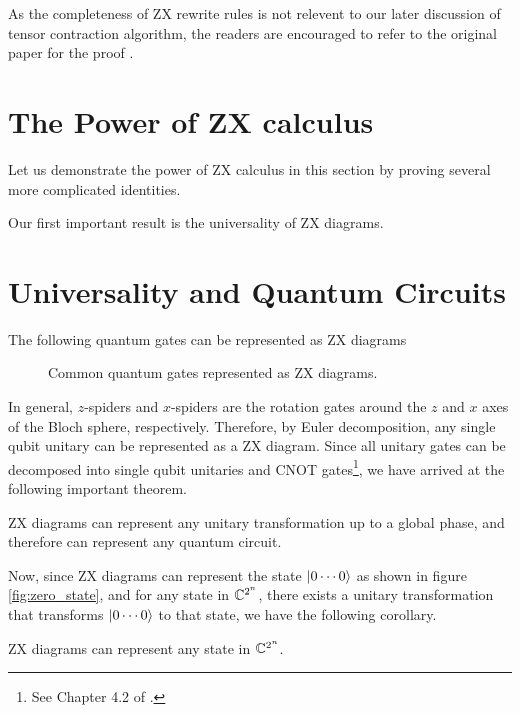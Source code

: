 As the completeness of ZX rewrite rules is not relevent to our later discussion of tensor contraction algorithm, the readers are encouraged to refer to the original paper for the proof \cite{completenessZXCalculus}.

\section{The Power of ZX calculus}

Let us demonstrate the power of ZX calculus in this section by proving several more complicated identities.

Our first important result is the universality of ZX diagrams.

\section{Universality and Quantum Circuits}

The following quantum gates can be represented as ZX diagrams

\begin{figure}[ht]
	\centering
	
	\caption{Common quantum gates represented as ZX diagrams.}
	\label{fig:zx_quantum_gates}
\end{figure}

In general, $z$-spiders and $x$-spiders are the rotation gates around the $z$ and $x$ axes of the Bloch sphere, respectively.
Therefore, by Euler decomposition, any single qubit unitary can be represented as a ZX diagram.
Since all unitary gates can be decomposed into single qubit unitaries and CNOT gates\footnote{See Chapter 4.2 of \cite{Nielsen_Chuang_2010}.}, we have arrived at the following important theorem.

\begin{lemma}
	ZX diagrams can represent any unitary transformation up to a global phase, and therefore can represent any quantum circuit.
\end{lemma}

Now, since ZX diagrams can represent the state $| 0 \cdots 0 \rangle$ as shown in figure \ref{fig:zero_state}, and for any state in $\mathbb{C}^{2^n}$, there exists a unitary transformation that transforms $| 0 \cdots 0 \rangle$ to that state, we have the following corollary.

\begin{corollary}
	ZX diagrams can represent any state in $\mathbb{C}^{2^n}$.
\end{corollary}


